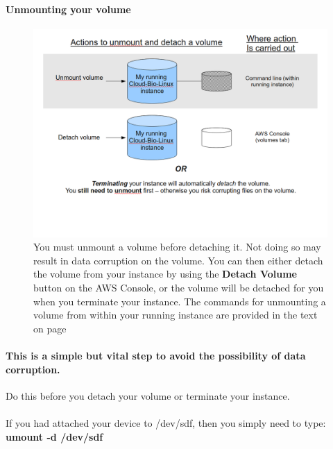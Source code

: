 \paragraph{Unmounting your volume}

\begin{figure}[!hd]
	\fbox
	{
		\begin{minipage}{13cm}
\includegraphics[width=\maxwidth]{"images/unmountDetach-1"}
\caption[Attaching a volume]{\label{fig:unmountdetach}You must unmount a volume before detaching it. Not doing so may result in data corruption on the volume. You can then either detach the volume from your instance by using the \textbf{Detach Volume} button on the AWS Console, or the volume will be detached for you when you terminate your instance. The commands for unmounting a volume from within your running instance are provided in the text on page \pageref{text:unmounting}}
		\end{minipage}
	}
\end{figure}

\paragraph{This is a simple but vital step to avoid the possibility of data corruption.} Do this before you detach your volume or terminate your instance.

\paragraph{}If you had attached your device to /dev/sdf, then you simply need to type:
\\\textbf{umount -d /dev/sdf}
\label{text:unmounting}
